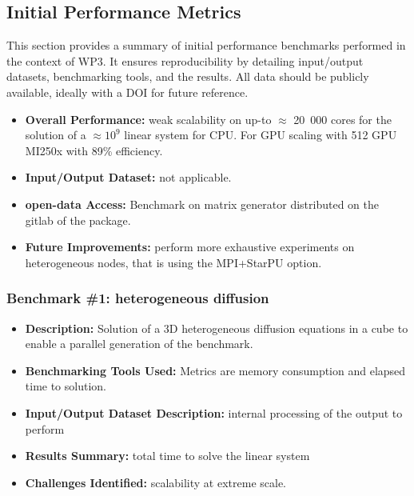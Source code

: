 \subsection{Initial Performance Metrics}
\label{sec:WP3:Composyx:metrics}

This section provides a summary of initial performance benchmarks
performed in the context of WP3. It ensures reproducibility by
detailing input/output datasets, benchmarking tools, and the results.
All data should be publicly available, ideally with a DOI for future
reference.

\begin{itemize}
    \item \textbf{Overall Performance:} weak scalability on up-to $\approx$ 20~000 cores for the solution of a $\approx 10^9$ linear system for CPU. For GPU scaling with 512 GPU MI250x with 89\% efficiency.
    \item \textbf{Input/Output Dataset:} not applicable.
    \item \textbf{open-data Access:} Benchmark on matrix generator distributed on the gitlab of the package.
    \item \textbf{Future Improvements:} perform more exhaustive experiments on heterogeneous nodes, that is using the MPI+StarPU option.
\end{itemize}

\subsubsection{Benchmark \#1: heterogeneous diffusion }
\begin{itemize}
    \item \textbf{Description:} Solution of a 3D heterogeneous diffusion equations in a cube to enable a parallel generation of the benchmark.
    \item \textbf{Benchmarking Tools Used:} Metrics are memory consumption and elapsed time to solution.
    \item \textbf{Input/Output Dataset Description:} internal processing of the output to perform
    \item \textbf{Results Summary:} total time to solve the linear system
    \item \textbf{Challenges Identified:} scalability at extreme scale.
\end{itemize}

